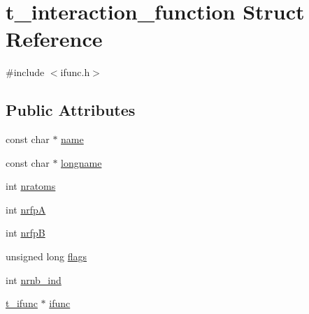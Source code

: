 \hypertarget{structt__interaction__function}{\section{t\-\_\-interaction\-\_\-function \-Struct \-Reference}
\label{structt__interaction__function}
}


{\ttfamily \#include $<$ifunc.\-h$>$}

\subsection*{\-Public \-Attributes}
\begin{DoxyCompactItemize}
\item 
const char $\ast$ \hyperlink{structt__interaction__function_a90a150b170c6343a7e573f1b5747c7d6}{name}
\item 
const char $\ast$ \hyperlink{structt__interaction__function_a1f73aa628f9f666864b5bd946c53e265}{longname}
\item 
int \hyperlink{structt__interaction__function_adae5684d70e578d5e130265d972b00db}{nratoms}
\item 
int \hyperlink{structt__interaction__function_a49bc601a9397dc7e953305e2afaec598}{nrfp\-A}
\item 
int \hyperlink{structt__interaction__function_a6e72f3e9baa6b2e39de38cfa3e0c5792}{nrfp\-B}
\item 
unsigned long \hyperlink{structt__interaction__function_abec7b297809d3b5d37780dec2498bab1}{flags}
\item 
int \hyperlink{structt__interaction__function_a665285156e4b7e470201b361f6dc579a}{nrnb\-\_\-ind}
\item 
\hyperlink{share_2template_2gromacs_2types_2ifunc_8h_a9e91717fd29779def4a38941df427ec1}{t\-\_\-ifunc} $\ast$ \hyperlink{structt__interaction__function_a78d06b78c1e074e8e1357ed3689a46a0}{ifunc}
\end{DoxyCompactItemize}


